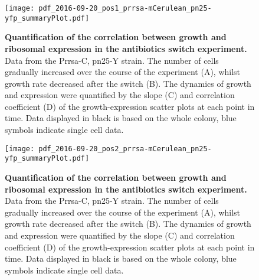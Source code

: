 \begin{figure}
    \begin{minipage}[c]{0.7\textwidth}
        \texttt{[image: pdf\_2016-09-20\_pos1\_prrsa-mCerulean\_pn25-yfp\_summaryPlot.pdf]}
    \end{minipage}\hfill
    \begin{minipage}[c]{0.3\textwidth}
        \caption{ 
            \textbf{Quantification of the correlation between growth and ribosomal expression in the antibiotics switch experiment.}
            Data from the Prrsa-C, pn25-Y strain. The number of cells gradually increased over the course of the experiment (A), whilst growth rate decreased after the switch (B).
            The dynamics of growth and expression were quantified by the slope (C) and correlation coefficient (D) of the growth-expression scatter plots at each point in time.
            Data displayed in black is based on the whole colony, blue symbols indicate single cell data.
        }
        \label{fig:ribo:switch3}
    \end{minipage}
\end{figure}
\begin{figure}
    \begin{minipage}[c]{0.7\textwidth}
        \texttt{[image: pdf\_2016-09-20\_pos2\_prrsa-mCerulean\_pn25-yfp\_summaryPlot.pdf]}
    \end{minipage}\hfill
    \begin{minipage}[c]{0.3\textwidth}
        \caption{ 
            \textbf{Quantification of the correlation between growth and ribosomal expression in the antibiotics switch experiment.}
            Data from the Prrsa-C, pn25-Y strain. The number of cells gradually increased over the course of the experiment (A), whilst growth rate decreased after the switch (B).
            The dynamics of growth and expression were quantified by the slope (C) and correlation coefficient (D) of the growth-expression scatter plots at each point in time.
            Data displayed in black is based on the whole colony, blue symbols indicate single cell data.
        }
        \label{fig:ribo:switch4}
    \end{minipage}
\end{figure}
